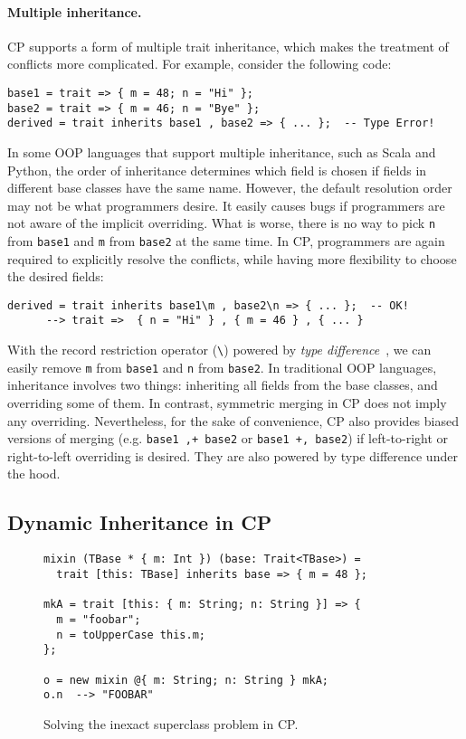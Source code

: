 \paragraph{Multiple inheritance.}
CP supports a form of multiple trait inheritance, which makes the treatment of
conflicts more complicated. For example, consider the following code:
\begin{lstlisting}
base1 = trait => { m = 48; n = "Hi" };
base2 = trait => { m = 46; n = "Bye" };
derived = trait inherits base1 , base2 => { ... };  -- Type Error!
\end{lstlisting}
In some OOP languages that support multiple inheritance, such as Scala and
Python, the order of inheritance determines which field is chosen if fields in
different base classes have the same name. However, the default resolution order
may not be what programmers desire. It easily causes bugs if programmers are not
aware of the implicit overriding. What is worse, there is no way to pick
\lstinline{n} from \lstinline{base1} and \lstinline{m} from \lstinline{base2} at
the same time. In CP, programmers are again required to explicitly resolve the
conflicts, while having more flexibility to choose the desired fields:
\begin{lstlisting}
derived = trait inherits base1\m , base2\n => { ... };  -- OK!
      --> trait =>  { n = "Hi" } , { m = 46 } , { ... }
\end{lstlisting}
With the record restriction operator (\lstinline{\}) powered by \emph{type
difference}~\citep{xu2023making}, we can easily remove \lstinline{m} from
\lstinline{base1} and \lstinline{n} from \lstinline{base2}. In traditional OOP
languages, inheritance involves two things: inheriting all fields from the base
classes, and overriding some of them. In contrast, symmetric merging in CP does
not imply any overriding. Nevertheless, for the sake of convenience, CP also
provides biased versions of merging (e.g. \lstinline{base1 ,+ base2} or
\lstinline{base1 +, base2}) if left-to-right or right-to-left overriding is
desired. They are also powered by type difference under the hood.

\subsection{Dynamic Inheritance in CP} \label{sec:dynamic}

\begin{figure}
\begin{lstlisting}[xleftmargin=.2\textwidth]
mixin (TBase * { m: Int }) (base: Trait<TBase>) =
  trait [this: TBase] inherits base => { m = 48 };

mkA = trait [this: { m: String; n: String }] => {
  m = "foobar";
  n = toUpperCase this.m;
};

o = new mixin @{ m: String; n: String } mkA;
o.n  --> "FOOBAR"
\end{lstlisting}
\caption{Solving the inexact superclass problem in CP.}
\label{fig:inexactCP}
\end{figure}

